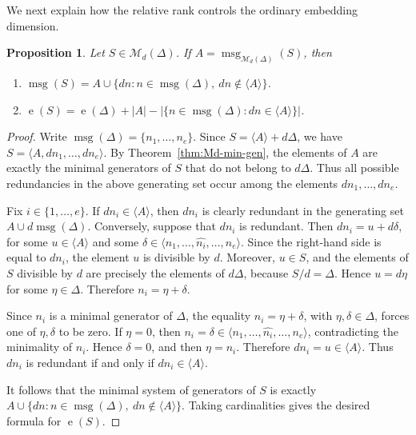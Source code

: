 \documentclass[12pt,a4paper]{amsart}
\newtheorem{proposition}[theorem]{Proposition}
\theoremstyle{definition}
\theoremstyle{remark}
\begin{document}
We next explain how the relative rank controls the ordinary embedding
dimension.

\begin{proposition}\label{prop:4.9}
Let \(S\in\mathcal{M}_d(\Delta)\). If
\(A=\operatorname{msg}_{\mathcal{M}_d(\Delta)}(S)\), then
\begin{enumerate}
    \item \(\operatorname{msg}(S) = A\cup \{dn:n\in\operatorname{msg}(\Delta),\ dn\notin\langle A\rangle\}\).
    \item \(\operatorname{e}(S) = \operatorname{e}(\Delta)+ |A| - \left| \{n\in\operatorname{msg}(\Delta):dn\in\langle A\rangle\} \right|\).
\end{enumerate}
\end{proposition}

\begin{proof}
Write \(\operatorname{msg}(\Delta)=\{n_1,\ldots,n_e\}\). Since \(S=\langle A\rangle+d\Delta\), we have \(S=\langle A,dn_1,\ldots,dn_e\rangle\). By Theorem~\ref{thm:Md-min-gen}, the elements of \(A\) are exactly the minimal generators of \(S\) that do not belong to \(d\Delta\). Thus all possible redundancies in the above generating set occur among the elements \(dn_1,\ldots,dn_e\).

Fix \(i\in\{1,\ldots,e\}\). If \(dn_i\in\langle A\rangle\), then \(dn_i\) is clearly redundant in the generating set \(A\cup d\operatorname{msg}(\Delta)\). Conversely, suppose that \(dn_i\) is redundant. Then \(dn_i=u+d\delta\), for some \(u\in\langle A\rangle\) and some \(\delta\in\langle n_1,\ldots,\widehat{n_i},\ldots,n_e\rangle\). Since the right-hand side is equal to \(dn_i\), the element \(u\) is divisible by \(d\). Moreover, \(u\in S\), and the elements of \(S\) divisible by \(d\) are precisely the elements of \(d\Delta\), because \(S/d=\Delta\). Hence \(u=d\eta\) for some \(\eta\in\Delta\). Therefore \(n_i=\eta+\delta\).

Since \(n_i\) is a minimal generator of \(\Delta\), the equality \(n_i=\eta+\delta\), with \(\eta,\delta\in\Delta\), forces one of \(\eta,\delta\) to be zero. If \(\eta=0\), then \(n_i=\delta\in\langle n_1,\ldots,\widehat{n_i},\ldots,n_e\rangle\), contradicting the minimality of \(n_i\). Hence \(\delta=0\), and then \(\eta=n_i\). Therefore \(dn_i=u\in\langle A\rangle\). Thus \(dn_i\) is redundant if and only if \(dn_i\in\langle A\rangle\).

It follows that the minimal system of generators of \(S\) is exactly \(A\cup \{dn:n\in\operatorname{msg}(\Delta),\ dn\notin\langle A\rangle\}\). Taking cardinalities gives the desired formula for \(\operatorname{e}(S)\).
\end{proof}
\end{document}
